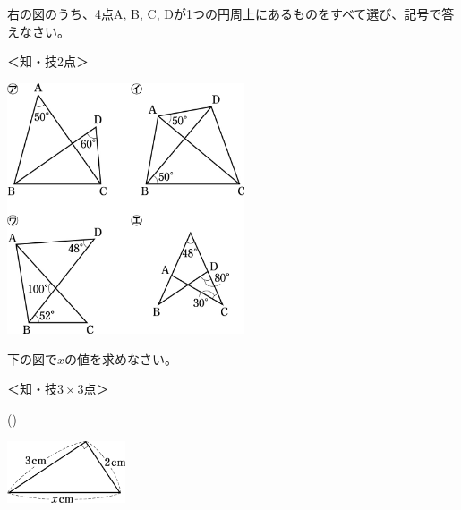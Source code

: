 \documentclass[
  12pt,a4paper,lualatex,ja=standard]{bxjsarticle}
\begin{document}
\begin{flushleft}
\begin{multicols}{2}

\noindent{} \hspace{1pt}右の図のうち、4点A, B, C, Dが1つの円周上にあるものをすべて選び、記号で答えなさい。

%
\begin{flushright}%
\footnotesize{＜知・技2点＞}%
\end{flushright}%


\vfill \null

\columnbreak

\begin{center}
\def\@captype{figure}
\includegraphics[width=70mm]{img/image9.jpg}

\end{center}

\end{multicols}

\vfill

\noindent{} \hspace{1pt}下の図で$x$の値を求めなさい。

%
\begin{flushright}%
\footnotesize{＜知・技$3\times 3$点＞}%
\end{flushright}%


\begin{multicols}{3}
()\hspace{2.5pt}

\def\@captype{figure}
\includegraphics[width=35mm]{img/image10.jpg}



\end{multicols}
\end{flushleft}
\end{document}
